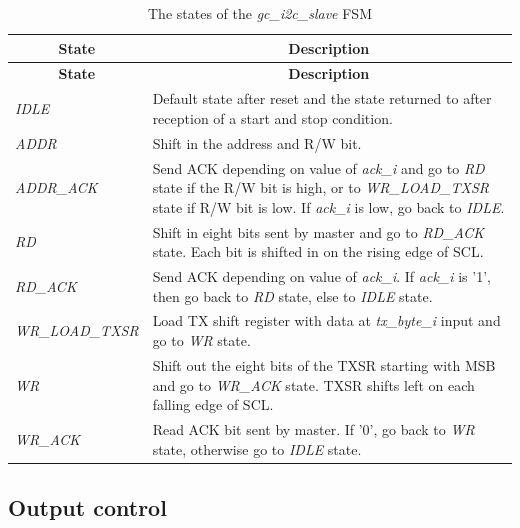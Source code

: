 \documentclass[a4paper,11pt]{article}
\begin{document}
{
\begin{longtable}{l p{}}
  \caption{The states of the \textit{gc\_i2c\_slave} FSM}
  \label{tbl:fsm} \\

    \hline
    \multicolumn{1}{c}{\textbf{State}} & \multicolumn{1}{c}{\textbf{Description}} \\
    \hline
    \endfirsthead
    
    \hline
    \multicolumn{1}{c}{\textbf{State}} & \multicolumn{1}{c}{\textbf{Description}} \\
    \hline
    \endhead
    
    \hline
    \endfoot
    
    \textit{IDLE} & Default state after reset and the state returned to after
                    reception of a start and stop condition. \\
    \textit{ADDR} & Shift in the address and R/W bit. \\
    \textit{ADDR\_ACK} & Send ACK depending on value of \textit{ack\_i} and go to \textit{RD} state
                         if the R/W bit is high, or to \textit{WR\_LOAD\_TXSR} state if R/W bit is low.
                         If \textit{ack\_i} is low, go back to \textit{IDLE}. \\
   \textit{RD} & Shift in eight bits sent by master and go to \textit{RD\_ACK} state. Each bit 
                 is shifted in on the rising edge of SCL. \\
    \textit{RD\_ACK} & Send ACK depending on value of \textit{ack\_i}. If \textit{ack\_i} is '1',
                       then go back to \textit{RD} state, else to \textit{IDLE} state. \\
    \textit{WR\_LOAD\_TXSR} & Load TX shift register with data at \textit{tx\_byte\_i} input
                              and go to \textit{WR} state. \\
    \textit{WR} & Shift out the eight bits of the TXSR starting with MSB and go to 
                  \textit{WR\_ACK} state. TXSR shifts left on each falling edge of SCL. \\
    \textit{WR\_ACK} & Read ACK bit sent by master. If '0', go back to \textit{WR} state, otherwise
                       go to \textit{IDLE} state. \\
\end{longtable}
}

\subsection{Output control}
\end{document}
